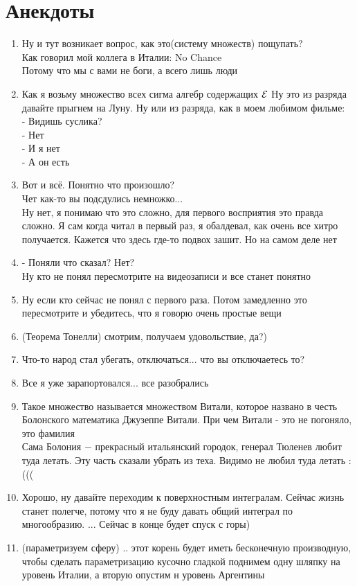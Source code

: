 \newpage
\section{Анекдоты}
\begin{enumerate}
    \item Ну и тут возникает вопрос, как это(систему множеств) пощупать? \\
    Как говорил мой коллега в Италии: No Chance \\
    Потому что мы с вами не боги, а всего лишь люди
    \item Как я возьму множество всех сигма алгебр содержащих $\mathcal{E}$ Ну это из разряда давайте прыгнем на Луну. Ну или из разряда, как в моем любимом фильме: \\
    - Видишь суслика? \\
    - Нет \\
    - И я нет \\
    - А он есть \\
    \item Вот и всё. Понятно что произошло? \\
    Чет как-то вы подсдулись немножко... \\
    Ну нет, я понимаю что это сложно, для первого восприятия это правда сложно. Я сам когда читал в первый раз, я обалдевал, как очень все хитро получается. Кажется что здесь где-то подвох зашит. Но на самом деле нет
    \item - Поняли что сказал? Нет? \\
    Ну кто не понял пересмотрите на видеозаписи и все станет понятно

    \item Ну если кто сейчас не понял с первого раза. Потом замедленно это пересмотрите и убедитесь, что я говорю очень простые вещи

    \item (Теорема Тонелли) смотрим, получаем удовольствие, да?)

    \item Что-то народ стал убегать, отключаться... что вы отключаетесь то?

    \item Все я уже зарапортовался... все разобрались

    \item Такое множество называется множеством Витали, которое названо в честь Болонского математика Джузеппе Витали. При чем Витали - это не погоняло, это фамилия\\ Сама Болония $-$ прекрасный итальянский городок, генерал Тюленев любит туда летать. Эту часть сказали убрать из теха. Видимо не любил туда летать :(((

    \item Хорошо, ну давайте переходим к поверхностным интегралам. Сейчас жизнь станет полегче, потому что я не буду давать общий интеграл по многообразию. ... Сейчас в конце будет спуск с горы)

    \item (параметризуем сферу) .. этот корень будет иметь бесконечную производную, чтобы сделать параметризацию кусочно гладкой поднимем одну шляпку на уровень Италии, а вторую опустим н уровень Аргентины
\end{enumerate}